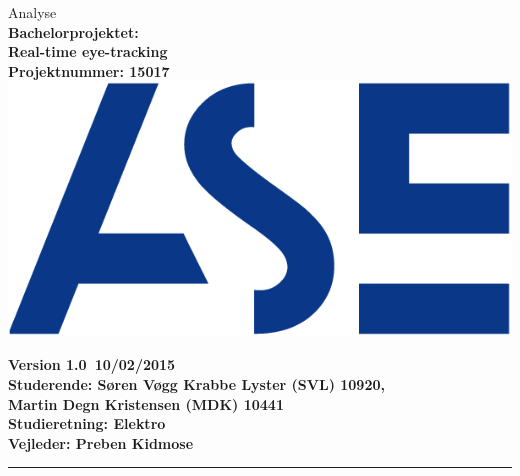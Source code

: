\documentclass[a4paper,oneside,12pt]{article}
\begin{document}
	\begin{titlepage}
		\centering
		\vfill
		{\LARGE Analyse}\\
		\vfill
		{\bfseries\large
			Bachelorprojektet: \\
			Real-time eye-tracking\\
			Projektnummer: 15017\\
		}
		\vfill
		\includegraphics{ASE_logo.png}
		\vfill
		{\bfseries\large
			Version 1.0\
			10/02/2015\\
			Studerende: Søren Vøgg Krabbe Lyster (SVL) 10920,\\
			Martin Degn Kristensen (MDK) 10441\\ 
			Studieretning: Elektro \\
			Vejleder: Preben Kidmose \\
			\vfill	
			\rule{6cm}{1pt}
		}
		
		
		
		
	\end{titlepage}
	\begin{versionhistory}
	\end{versionhistory}
	\tableofcontents
	
	
	
\end{document}
